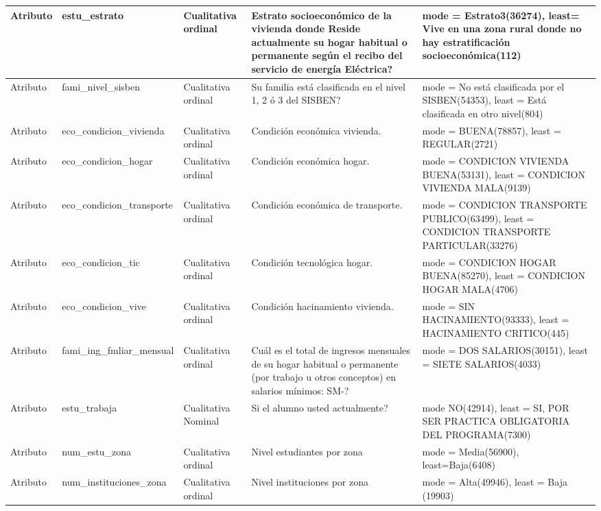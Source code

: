 \begin{table}[H]
\begin{flushleft}
\begin{tabular}{|>{\centering\arraybackslash}m{2cm}|>{\arraybackslash}m{4cm}|>{\arraybackslash}m{2cm}|>{\arraybackslash}m{3cm}|>{\arraybackslash}m{4cm}| }
Atributo & estu\_estrato & Cualitativa ordinal & Estrato socioeconómico de la vivienda donde Reside actualmente
su hogar habitual o permanente según el recibo del servicio de energía
Eléctrica? & mode = Estrato3(36274), least=
Vive en una zona rural donde no hay estratificación socioeconómica(112) \\ \hline
Atributo & fami\_nivel\_sisben & Cualitativa ordinal & Su familia está clasificada en el nivel 1, 2 ó 3 del
SISBEN? & mode = No está clasificada por el SISBEN(54353), least = Está clasificada en otro nivel(804)
 \\ \hline
Atributo & eco\_condicion\_vivienda & Cualitativa ordinal & Condición económica vivienda. & mode = BUENA(78857), least = REGULAR(2721) \\ \hline
Atributo & eco\_condicion\_hogar & Cualitativa ordinal & Condición económica hogar. & mode = CONDICION VIVIENDA BUENA(53131), least = CONDICION VIVIENDA MALA(9139) \\ \hline
Atributo & eco\_condicion\_transporte & Cualitativa ordinal & Condición económica de transporte. & mode = CONDICION TRANSPORTE PUBLICO(63499), least =
CONDICION TRANSPORTE PARTICULAR(33276)
 \\ \hline
Atributo & eco\_condicion\_tic & Cualitativa ordinal & Condición tecnológica hogar. & mode = CONDICION HOGAR BUENA(85270), least = CONDICION HOGAR MALA(4706) \\ \hline
Atributo & eco\_condicion\_vive & Cualitativa ordinal & Condición hacinamiento vivienda. & mode = SIN HACINAMIENTO(93333), least = HACINAMIENTO CRITICO(445) \\ \hline
Atributo & fami\_ing\_fmliar\_mensual & Cualitativa ordinal & Cuál es el total de ingresos mensuales de su hogar habitual o
permanente (por trabajo u otros conceptos) en salarios mínimos:
SM-? & mode = DOS SALARIOS(30151), least = SIETE SALARIOS(4033) \\ \hline
Atributo & estu\_trabaja & Cualitativa Nominal & Si el alumno usted actualmente? & mode NO(42914), least = SI, POR SER PRACTICA OBLIGATORIA DEL PROGRAMA(7300) \\ \hline
Atributo & num\_estu\_zona & Cualitativa ordinal & Nivel estudiantes por zona  & mode = Media(56900), least=Baja(6408) \\ \hline
Atributo & num\_instituciones\_zona & Cualitativa ordinal & Nivel instituciones por zona  & mode = Alta(49946), least = Baja (19903) \\ \hline
\end{tabular}
\end{flushleft}
\label{}
\end{table}


\cite{mitchell1997machine}
